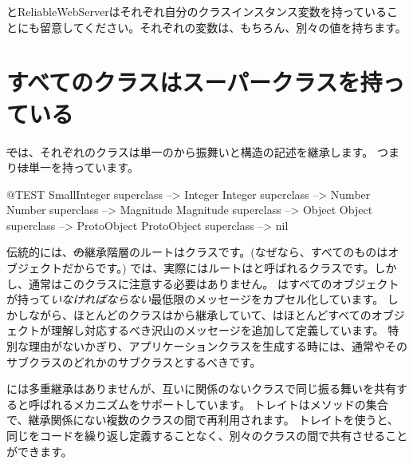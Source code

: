 \documentclass[a4paper,10pt,twoside]{book}
\begin{document}
と{ReliableWebServer}はそれぞれ自分のクラスインスタンス変数を持っていることにも留意してください。それぞれの変数は、もちろん、別々の値を持ちます。

\section{すべてのクラスはスーパークラスを持っている}


\st では、それぞれのクラスは単一のから振舞いと構造の記述を継承します。
つまり\st は単一を持っています。

\begin{code}{@TEST}
SmallInteger superclass --> Integer
Integer superclass          --> Number
Number superclass        --> Magnitude
Magnitude superclass    --> Object
Object superclass           --> ProtoObject
ProtoObject superclass  --> nil
\end{code}

伝統的には、\st の継承階層のルートはクラスです。(なぜなら、すべてのものはオブジェクトだからです。)
\pharo では、実際にはルートはと呼ばれるクラスです。しかし、通常はこのクラスに注意する必要はありません。
はすべてのオブジェクトが持って\emph{いなければならない}最低限のメッセージをカプセル化しています。
しかしながら、ほとんどのクラスはから継承していて、はほとんどすべてのオブジェクトが理解し対応するべき沢山のメッセージを追加して定義しています。
特別な理由がないかぎり、アプリケーションクラスを生成する時には、通常やそのサブクラスのどれかのサブクラスとするべきです。



\pharo には多重継承はありませんが、互いに関係のないクラスで同じ振る舞いを共有すると呼ばれるメカニズムをサポートしています。
トレイトはメソッドの集合で、継承関係にない複数のクラスの間で再利用されます。
トレイトを使うと、同じをコードを繰り返し定義することなく、別々のクラスの間で共有させることができます。
\end{document}
